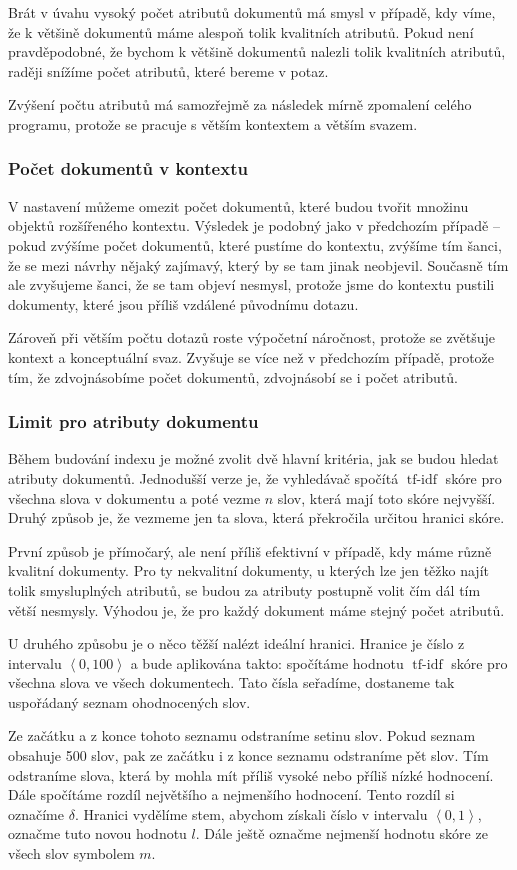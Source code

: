 \documentclass[12pt]{article}
\newcommand{\sssection}[1]{\subsubsection{#1}}
\newcommand{\addsp}[1]{\left<#1\right>}
\DeclareMathOperator{\tfidf}{tf-idf}
\begin{document}
Brát v úvahu vysoký počet atributů dokumentů má smysl v případě, kdy víme, že k většině dokumentů máme alespoň tolik kvalitních atributů. Pokud není pravděpodobné, že bychom k většině dokumentů nalezli tolik kvalitních atributů, raději snížíme počet atributů, které bereme v potaz. 

Zvýšení počtu atributů má samozřejmě za následek mírně zpomalení celého programu, protože se pracuje s větším kontextem a větším svazem. 

\sssection{Počet dokumentů v kontextu}
V nastavení můžeme omezit počet dokumentů, které budou tvořit množinu objektů rozšířeného kontextu. Výsledek je podobný jako v předchozím případě -- pokud zvýšíme počet dokumentů, které pustíme do kontextu, zvýšíme tím šanci, že se mezi návrhy nějaký zajímavý, který by se tam jinak neobjevil. Současně tím ale zvyšujeme šanci, že se tam objeví nesmysl, protože jsme do kontextu pustili dokumenty, které jsou příliš vzdálené původnímu dotazu.

Zároveň při větším počtu dotazů roste výpočetní náročnost, protože se zvětšuje kontext a konceptuální svaz. Zvyšuje se více než v předchozím případě, protože tím, že zdvojnásobíme počet dokumentů, zdvojnásobí se i počet atributů. 

\sssection{Limit pro atributy dokumentu}
Během budování indexu je možné zvolit dvě hlavní kritéria, jak se budou hledat atributy dokumentů. Jednodušší verze je, že vyhledávač spočítá $\tfidf$ skóre pro všechna slova v dokumentu a poté vezme $n$ slov, která mají toto skóre nejvyšší. Druhý způsob je, že vezmeme jen ta slova, která překročila určitou hranici skóre. 

První způsob je přímočarý, ale není příliš efektivní v případě, kdy máme různě kvalitní dokumenty. Pro ty nekvalitní dokumenty, u kterých lze jen těžko najít tolik smysluplných atributů, se budou za atributy postupně volit čím dál tím větší nesmysly. Výhodou je, že pro každý dokument máme stejný počet atributů.

U druhého způsobu je o něco těžší nalézt ideální hranici. Hranice je číslo z intervalu $\addsp{0, 100}$ a bude aplikována takto: spočítáme hodnotu $\tfidf$ skóre pro všechna slova ve všech dokumentech. Tato čísla seřadíme, dostaneme tak uspořádaný seznam ohodnocených slov. 

Ze začátku a z konce tohoto seznamu odstraníme setinu slov. Pokud seznam obsahuje 500 slov, pak ze začátku i z konce seznamu odstraníme pět slov. Tím odstraníme slova, která by mohla mít příliš vysoké nebo příliš nízké hodnocení. Dále spočítáme rozdíl největšího a nejmenšího hodnocení. Tento rozdíl si označíme $\delta$. Hranici vydělíme stem, abychom získali číslo v intervalu $\addsp{0, 1}$, označme tuto novou hodnotu $l$. Dále ještě označme nejmenší hodnotu skóre ze všech slov symbolem $m$. 
\end{document}
